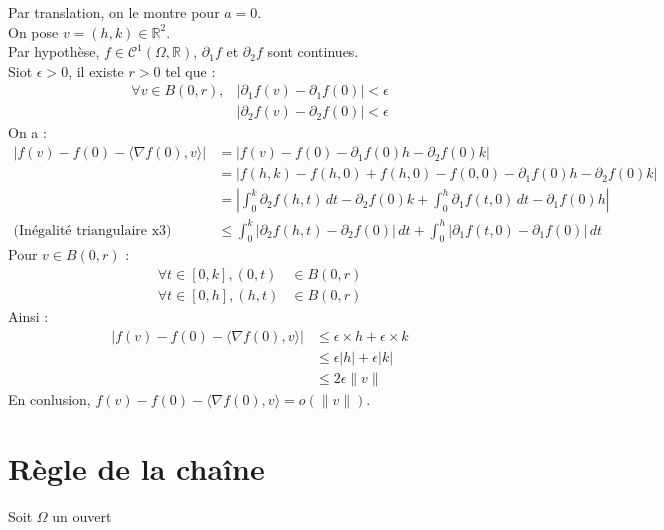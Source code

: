 \documentclass[../main.tex]{subfiles}
\begin{document}
\noindent Par translation, on le montre pour $a = 0$. \\
On pose $v = (h, k)\in \mathbb{R}^2$. \\
Par hypothèse, $f\in \mathcal{C}^1(\Omega, \mathbb{R})$, $\partial_1f$ et $\partial_2f$ sont continues. \\
Siot $\epsilon > 0$, il existe $r > 0$ tel que :
\begin{align*}
    \forall v\in B(0, r), &|\partial_1f(v) - \partial_1f(0)| < \epsilon \\
    &|\partial_2f(v) - \partial_2f(0)| < \epsilon
\end{align*}
On a : 
\begin{align*}
    |f(v) - f(0) - \langle \nabla f(0), v\rangle| &= |f(v) - f(0) - \partial_1f(0)h - \partial_2f(0)k| \\
    &= |f(h, k) - f(h, 0) + f(h, 0) - f(0, 0) - \partial_1f(0)h - \partial_2f(0)k| \\
    &= \left| \int_{0}^{k} \partial_2 f(h, t) \,dt - \partial_2 f(0) k + \int_{0}^{h} \partial_{1} f(t, 0) \,dt - \partial_1 f(0) h \right| \\
    \text{(Inégalité triangulaire x3)}\quad &\leq \int_{0}^{k} |\partial_2 f(h, t) - \partial_2 f(0)| \,dt+ \int_{0}^{h} |\partial_{1} f(t, 0) - \partial_1 f(0)| \,dt
\end{align*}
Pour $v\in B(0, r)$ : 
\begin{align*}
    \forall t\in [0, k], (0, t) &\in B(0, r) \\
    \forall t\in [0, h], (h, t) &\in B(0, r)
\end{align*}
Ainsi : 
\begin{align*}
    |f(v) - f(0) - \langle \nabla f(0), v\rangle| &\leq \epsilon \times h + \epsilon \times k \\
    &\leq \epsilon |h| + \epsilon |k| \\
    &\leq 2\epsilon \|v\|
\end{align*}
En conlusion, $f(v) - f(0) - \langle \nabla f(0), v\rangle = o(\|v\|)$. 

\section{Règle de la chaîne}
\begin{tcolorbox}[title=Théorème 36.42, title filled=false, colframe=orange, colback=orange!10!white]
    Soit $\Omega$ un ouvert
\end{tcolorbox}
\end{document}
